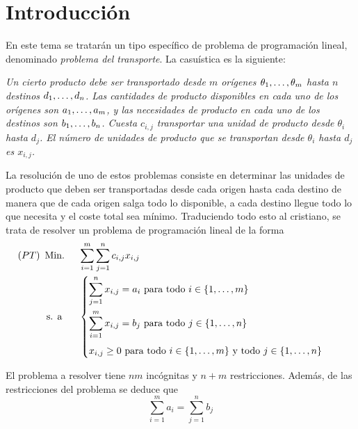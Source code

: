 \documentclass[11pt]{report}
\theoremstyle{mytheorem}
\theoremstyle{mydefinition}
\theoremstyle{myexample}
\begin{document}
\section{Introducción}

En este tema se tratarán un tipo específico de problema de programación lineal, denominado {\textit{problema del transporte}}. La casuística es la siguiente:



\textit{Un cierto producto debe ser transportado desde $m$ orígenes $\theta_1,\mathellipsis,\theta_m$ hasta $n$ destinos $d_1,\mathellipsis,d_n$. Las cantidades de producto disponibles en cada uno de los orígenes son $a_1,\mathellipsis,a_m$, y las necesidades de producto en cada uno de los destinos son $b_1,\mathellipsis,b_n$. Cuesta $c_{i,j}$ transportar una unidad de producto desde $\theta_i$ hasta $d_j$. El número de unidades de producto que se transportan desde $\theta_i$ hasta $d_j$ es $x_{i,j}$.}



La resolución de uno de estos problemas consiste en determinar las unidades de producto que deben ser transportadas desde cada origen hasta cada destino de manera que de cada origen salga todo lo disponible, a cada destino llegue todo lo que necesita y el coste total sea mínimo. Traduciendo todo esto al cristiano, se trata de resolver un problema de programación lineal de la forma
\[\begin{aligned}[t]
(PT) \ \, &\text{Min. } && \sum_{i=1}^m \sum_{j=1}^n c_{i,j}x_{i,j} \\
& \, \text{s. a} &&\begin{cases}
    \displaystyle{\sum_{j=1}^n x_{i,j}} = a_i \textup{ para todo } i \in \{1,\mathellipsis,m\} \\[14pt]
    \displaystyle{\sum_{i=1}^m x_{i,j}} = b_j \textup{ para todo } j \in \{1,\mathellipsis,n\} \\[14pt]
    x_{i,j} \geq 0 \textup{ para todo } i \in \{1,\mathellipsis,m\} \textup{ y todo } j \in \{1,\mathellipsis,n\} \phantom{\sum}
\end{cases}
\end{aligned}\]

El problema a resolver tiene $nm$ incógnitas y $n+m$ restricciones. Además, de las restricciones del problema se deduce que
\[\sum_{i=1}^ma_i = \sum_{j=1}^nb_j\]
\end{document}
